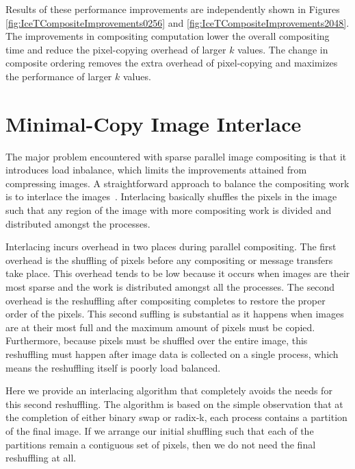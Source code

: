 \documentclass{acm_proc_article-sp}
\newcommand*{\lcite}[1]{~\cite{#1}}
\begin{document}
Results of these performance improvements are independently shown in
Figures \ref{fig:IceTCompositeImprovements0256} and
\ref{fig:IceTCompositeImprovements2048}.  The improvements in compositing
computation lower the overall compositing time and reduce the pixel-copying
overhead of larger $k$ values.  The change in composite ordering removes
the extra overhead of pixel-copying and maximizes the performance of larger
$k$ values.

\section{Minimal-Copy Image Interlace}
\label{sec:ImageInterlacing}

The major problem encountered with sparse parallel image compositing is
that it introduces load inbalance, which limits the improvements attained
from compressing images.  A straightforward approach to balance the
compositing work is to interlace the
images\lcite{Molnar1994,Takeuchi2003}.  Interlacing basically shuffles the
pixels in the image such that any region of the image with more compositing
work is divided and distributed amongst the processes.

Interlacing incurs overhead in two places during parallel compositing.  The
first overhead is the shuffling of pixels before any compositing or message
transfers take place.  This overhead tends to be low because it occurs when
images are their most sparse and the work is distributed amongst all the
processes.  The second overhead is the reshuffling after compositing
completes to restore the proper order of the pixels.  This second suffling
is substantial as it happens when images are at their most full and the
maximum amount of pixels must be copied.  Furthermore, because pixels must
be shuffled over the entire image, this reshuffling must happen after image
data is collected on a single process, which means the reshuffling itself
is poorly load balanced.

Here we provide an interlacing algorithm that completely avoids the needs
for this second reshuffling.  The algorithm is based on the simple
observation that at the completion of either binary swap or radix-k, each
process contains a partition of the final image.  If we arrange our initial
shuffling such that each of the partitions remain a contiguous set of
pixels, then we do not need the final reshuffling at all.
\end{document}

